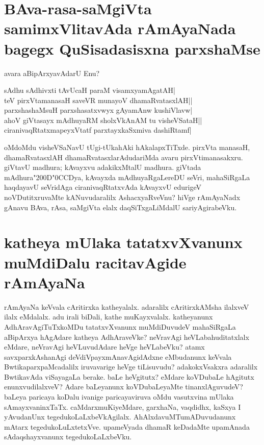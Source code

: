 \section*{BAva-rasa-saMgiVta samimxVlitavAda rAmAyaNada bagegx QuSisadasisxna parxshaMse}

avara aBipArxyavAdarU Enu?

\begin{shloka}
sAdhu sAdhivxti tAvUcaH paraM visamxyamAgatAH|\label{242a}\\
teV pirxVtamanasaH saveVR munayoV dhamaRvatasxlAH||\\
parxshashaMsuH parxshasatxvwyx gAyamAnw kushiVlavw|\label{243a}\\
ahoV giVtasayx mAdhuyaRM sholxVkAnAM tu visheVSataH||\\
ciranivaqRtatxmapeyxVtatf parxtayxkaSxmiva dashiRtamf|\label{243}\\
\end{shloka}

oMdoMdu visheVSaNavU tUgi-tUkahAki hAkalapxTiTxde. pirxVta manasaH, dhamaRvatasxlAH dhamaRvatasxlarAdudariMda avaru pirxVtimanasakxru. giVtavU madhura; kAvayxvu adakikxMtalU madhura. giVtada mAdhura\char"200D\char"0CCDya,  kAvayxda mAdhuyaRgaLereDU seVri, mahaSiRgaLa haqdayavU seVridAga ciranivaqRtatxvAda kAvayxvU edurigeV noVDutitxruvaMte kANuvudaralilx AshacxyaRveVnu? hiVge rAmAyaNadx gAnavu BAva, rAsa, saMgiVta elalx daqSiTxgaLiMdalU sariyAgirabeVku. 

\section*{katheya mUlaka tatatxvXvanunx muMdiDalu racitavAgide rAmAyaNa}

rAmAyaNa keVvala cAritirxka katheyalalx. adaralilx cAritirxkAMsha ilalxveV ilalx eMdalalx. adu irali biDali, kathe muKayxvalalx. katheyanunx AdhAravAgiTuTxkoMDu tatatxvXvanunx muMdiDuvudeV mahaSiRgaLa aBipArxya hAgAdare katheya AdhAraveVke? neVravAgi heVLabahuditatxlalx eMdare, neVravAgi heVLuvudAdare heVge heVLabeVku? atamx savxparxkAshanAgi deVdiVpayxmAnavAgidAdxne eMbudanunx keVvala BwtikaparxpaMcadalilx iruvavarige heVge tiLisuvudu? adakokxVsakxra adaralilx BwtikavAda viSayagaLa berake. baLe heVgitutx? eMdare koVDubaLe hAgitutx enunxvudilalxveV? Adare baLeyanunx koVDubaLeyaMte tinanxlAguvudeV? baLeya paricaya koDalu ivanige paricayaviruva oMdu vasutxvina mUlaka sAmayxvaninxTaTx. caMdarxmuKiyeMdare, garxhaNa, vaqdidhx, kaSxya I yAvudanUnx tegedukoLaLxbeVkAgilalx. AhAlxdavuMTumADuvudanunx mAtarx tegedukoLuLxtetxVve. upameVyada dhamaR keDadaMte upamAnada sAdaqshayxvanunx tegedukoLaLxbeVku. 


